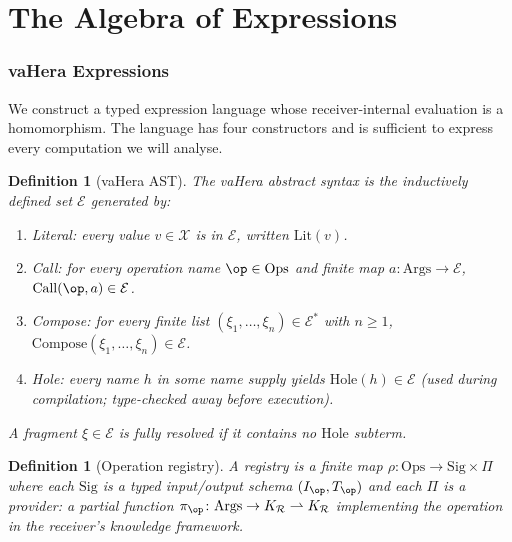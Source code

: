 \documentclass[twocolumn,a4paper]{article}
\newtheorem{definition}[theorem]{Definition}
\newcommand{\Cands}{\mathcal{X}}
\newcommand{\Expr}{\mathcal{E}}
\newcommand{\receiver}{\mathcal{R}}
\begin{document}
\part{The Algebra of Expressions}

\section{vaHera Expressions}
\label{sec:vahera}

We construct a typed expression language whose receiver-internal evaluation is a homomorphism. The language has four constructors and is sufficient to express every computation we will analyse.

\begin{definition}[vaHera AST]
\label{def:vahera}
The \emph{vaHera abstract syntax} is the inductively defined set $\Expr$ generated by:
\begin{enumerate}[nosep,label=(\arabic*)]
\item \emph{Literal}: every value $v\in\Cands$ is in $\Expr$, written $\mathrm{Lit}(v)$.
\item \emph{Call}: for every operation name $\op\in\mathrm{Ops}$ and finite map $a\colon\mathrm{Args}\to\Expr$, $\mathrm{Call}(\op,a)\in\Expr$.
\item \emph{Compose}: for every finite list $(\xi_{1},\ldots,\xi_{n})\in\Expr^{*}$ with $n\geq 1$, $\mathrm{Compose}(\xi_{1},\ldots,\xi_{n})\in\Expr$.
\item \emph{Hole}: every name $h$ in some name supply yields $\mathrm{Hole}(h)\in\Expr$ (used during compilation; type-checked away before execution).
\end{enumerate}
A fragment $\xi\in\Expr$ is \emph{fully resolved} if it contains no $\mathrm{Hole}$ subterm.
\end{definition}

\begin{definition}[Operation registry]
\label{def:registry}
A \emph{registry} is a finite map $\rho\colon\mathrm{Ops}\to\mathrm{Sig}\times\Pi$ where each $\mathrm{Sig}$ is a typed input/output schema $(I_{\op},T_{\op})$ and each $\Pi$ is a \emph{provider}: a partial function $\pi_{\op}\colon\mathrm{Args}\to K_{\receiver}\rightharpoonup K_{\receiver}$ implementing the operation in the receiver's knowledge framework.
\end{definition}
\end{document}
